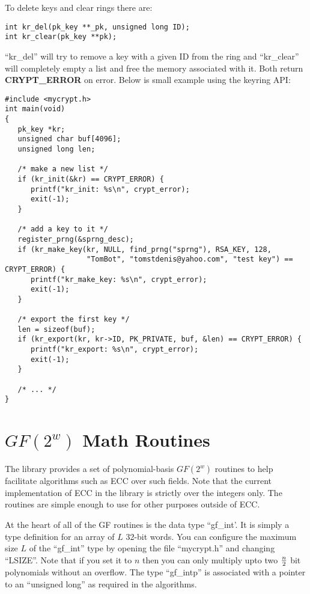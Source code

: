 \documentclass{book}
\begin{document}
To delete keys and clear rings there are:
\begin{verbatim}
int kr_del(pk_key **_pk, unsigned long ID);
int kr_clear(pk_key **pk);
\end{verbatim}
``kr\_del'' will try to remove a key with a given ID from the ring and ``kr\_clear'' will completely empty a list and free
the memory associated with it.  Both return {\bf CRYPT\_ERROR} on error.  Below is small example using the keyring API:

\begin{small}
\begin{verbatim}
#include <mycrypt.h>
int main(void)
{
   pk_key *kr;
   unsigned char buf[4096];
   unsigned long len;

   /* make a new list */
   if (kr_init(&kr) == CRYPT_ERROR) {
      printf("kr_init: %s\n", crypt_error);
      exit(-1);
   }

   /* add a key to it */
   register_prng(&sprng_desc);
   if (kr_make_key(kr, NULL, find_prng("sprng"), RSA_KEY, 128, 
                   "TomBot", "tomstdenis@yahoo.com", "test key") == CRYPT_ERROR) {
      printf("kr_make_key: %s\n", crypt_error);
      exit(-1);
   }

   /* export the first key */
   len = sizeof(buf);
   if (kr_export(kr, kr->ID, PK_PRIVATE, buf, &len) == CRYPT_ERROR) {
      printf("kr_export: %s\n", crypt_error);
      exit(-1);
   }

   /* ... */
}  
\end{verbatim}
\end{small}

\chapter{$GF(2^w)$ Math Routines}

The library provides a set of polynomial-basis $GF(2^w)$ routines to help facilitate algorithms such as ECC over such
fields.  Note that the current implementation of ECC in the library is strictly over the integers only.  The routines
are simple enough to use for other purposes outside of ECC.  

At the heart of all of the GF routines is the data type ``gf\_int'.  It is simply a type definition for an array of 
$L$ 32-bit words.  You can configure the maximum size $L$ of the ``gf\_int'' type by opening the file ``mycrypt.h'' and 
changing ``LSIZE''.  Note that if you set it to $n$ then you can only multiply upto two $n \over 2$ bit polynomials without
an overflow.  The type ``gf\_intp'' is associated with a pointer to an ``unsigned long'' as required in the algorithms.
\end{document}

